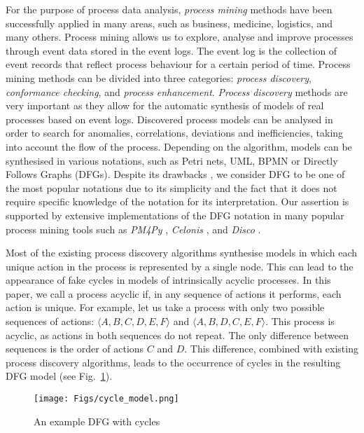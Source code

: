 \documentclass[11pt]{article}
\theoremstyle{definition}
\begin{document}
For the purpose of process data analysis, \emph{process mining} \citep{Aalst16} methods have been successfully applied in many areas, such as business, medicine, logistics, and many others. Process mining allows us to explore, analyse and improve processes through event data stored in the event logs. The event log is the collection of event records that reflect process behaviour for a certain period of time. 
Process mining methods can be divided into three categories: \textit{process discovery}, \textit{conformance checking}, and \textit{process enhancement}. 
\textit{Process discovery} methods are very important \citep{guide} as they allow for the automatic synthesis of models of real processes based on event logs. 
Discovered process models can be analysed in order to search for anomalies, correlations, deviations and inefficiencies, taking into account the flow of the process. 
Depending on the algorithm, models can be synthesised in various notations, such as Petri nets, UML, BPMN or Directly Follows Graphs (DFGs). 
Despite its drawbacks \citep{vanderAalst2020}, we consider DFG to be one of the most popular notations due to its simplicity and the fact that it does not require specific knowledge of the notation for its interpretation. Our assertion is supported by extensive implementations of the DFG notation in many popular process mining tools such as \emph{PM4Py} \citep{BERTI2023100556}, \emph{Celonis} \citep{Celonis}, and \emph{Disco} \citep{Disco}.

Most of the existing process discovery algorithms synthesise models in which each unique action in the process is represented by a single node. This can lead to the appearance of fake cycles in models of intrinsically acyclic processes. 
In this paper, we call a process acyclic if, in any sequence of actions it performs, each action is unique. 
For example, let us take a process with only two possible sequences of actions: $\langle A, B, C, D, E, F \rangle$ and $\langle A, B, D, C, E, F \rangle$. This process is acyclic, as actions in both sequences do not repeat. The only difference between sequences is the order of actions $C$ and $D$. This difference, combined with existing process discovery algorithms, leads to the occurrence of cycles in the resulting DFG model (see Fig.~\ref{fig:cycle_model}).

\begin{figure}[htb]
    \centering
    \texttt{[image: Figs/cycle\_model.png]}
    \caption{An example DFG with cycles}
    \label{fig:cycle_model}
\end{figure}
\end{document}

